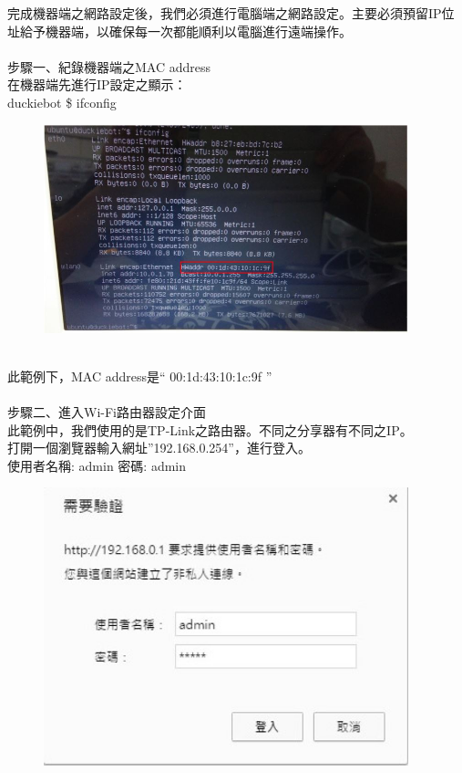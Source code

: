 \documentclass{article}
\begin{document}
完成機器端之網路設定後，我們必須進行電腦端之網路設定。主要必須預留IP位址給予機器端，以確保每一次都能順利以電腦進行遠端操作。
\\
\\步驟一、紀錄機器端之MAC address
\\在機器端先進行IP設定之顯示：
\\duckiebot \$ ifconfig
\begin{figure}[htp]
    \begin{center}
        \includegraphics[width=300pt]{pic/圖片13.jpg}
    \end{center}
\end{figure}
\\此範例下，MAC address是“ 00:1d:43:10:1c:9f ”
\\
\\步驟二、進入Wi-Fi路由器設定介面
\\此範例中，我們使用的是TP-Link之路由器。不同之分享器有不同之IP。
\\打開一個瀏覽器輸入網址”192.168.0.254”，進行登入。
\\使用者名稱: admin   密碼: admin
\begin{figure}[htp]
    \begin{center}
        \includegraphics[width=300pt]{pic/圖片14.jpg}
    \end{center}
\end{figure}
\end{document}
